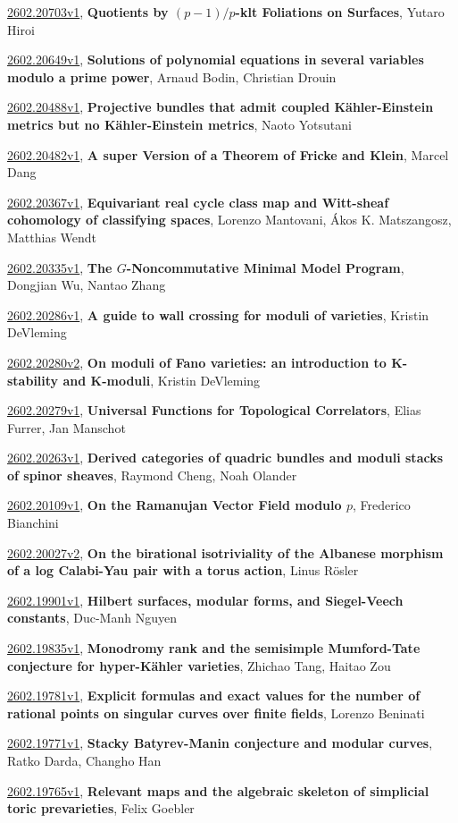 \documentclass[9pt, a4paper]{article}
\theoremstyle{plain}
\theoremstyle{definition}
\theoremstyle{remark}
\newcommand{\arxiv}[3]{\href{https://arxiv.org/abs/#1}{#1}, \textbf{\textcolor{arxivblue}{#2}}, #3}
\begin{document}
\arxiv{2602.20703v1}{Quotients by $(p-1)/p$-klt Foliations on Surfaces}{Yutaro Hiroi}

\arxiv{2602.20649v1}{Solutions of polynomial equations in several variables modulo a prime power}{Arnaud Bodin, Christian Drouin}

\arxiv{2602.20488v1}{Projective bundles that admit coupled Kähler-Einstein metrics but no Kähler-Einstein metrics}{Naoto Yotsutani}

\arxiv{2602.20482v1}{A super Version of a Theorem of Fricke and Klein}{Marcel Dang}

\arxiv{2602.20367v1}{Equivariant real cycle class map and Witt-sheaf cohomology of classifying spaces}{Lorenzo Mantovani, Ákos K. Matszangosz, Matthias Wendt}

\arxiv{2602.20335v1}{The $G$-Noncommutative Minimal Model Program}{Dongjian Wu, Nantao Zhang}

\arxiv{2602.20286v1}{A guide to wall crossing for moduli of varieties}{Kristin DeVleming}

\arxiv{2602.20280v2}{On moduli of Fano varieties: an introduction to K-stability and K-moduli}{Kristin DeVleming}

\arxiv{2602.20279v1}{Universal Functions for Topological Correlators}{Elias Furrer, Jan Manschot}

\arxiv{2602.20263v1}{Derived categories of quadric bundles and moduli stacks of spinor sheaves}{Raymond Cheng, Noah Olander}

\arxiv{2602.20109v1}{On the Ramanujan Vector Field modulo $p$}{Frederico Bianchini}

\arxiv{2602.20027v2}{On the birational isotriviality of the Albanese morphism of a log Calabi-Yau pair with a torus action}{Linus Rösler}

\arxiv{2602.19901v1}{Hilbert surfaces, modular forms, and Siegel-Veech constants}{Duc-Manh Nguyen}

\arxiv{2602.19835v1}{Monodromy rank and the semisimple Mumford-Tate conjecture for hyper-Kähler varieties}{Zhichao Tang, Haitao Zou}

\arxiv{2602.19781v1}{Explicit formulas and exact values for the number of rational points on singular curves over finite fields}{Lorenzo Beninati}

\arxiv{2602.19771v1}{Stacky Batyrev-Manin conjecture and modular curves}{Ratko Darda, Changho Han}

\arxiv{2602.19765v1}{Relevant maps and the algebraic skeleton of simplicial toric prevarieties}{Felix Goebler}
\end{document}

